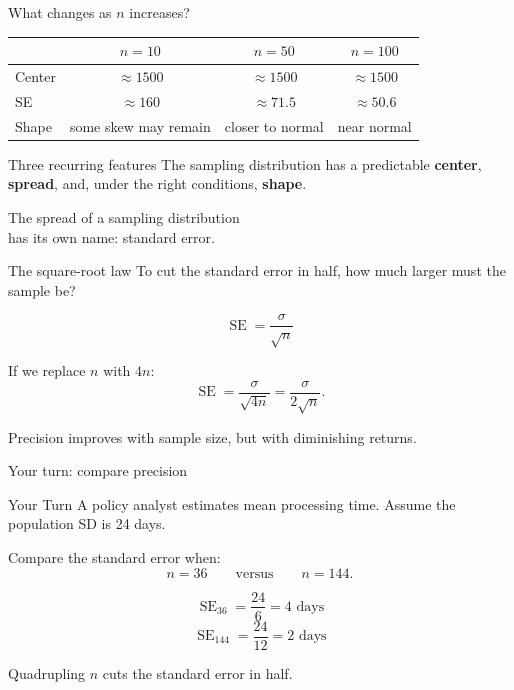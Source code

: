 \documentclass[11pt,aspectratio=169]{beamer}
\newcommand{\yourturn}[1]{%
\begin{center}
\begin{minipage}{0.90\textwidth}
\begin{alertblock}{Your Turn}
#1
\end{alertblock}
\end{minipage}
\end{center}}
\newcommand{\SE}{\operatorname{SE}}
\begin{document}
\begin{frame}{What changes as $n$ increases?}
\begin{center}
\renewcommand{\arraystretch}{1.3}
\begin{tabular}{lccc}
\toprule
 & $n=10$ & $n=50$ & $n=100$ \\
\midrule
Center & $\approx1500$ & $\approx1500$ & $\approx1500$ \\
SE & $\approx160$ & $\approx71.5$ & $\approx50.6$ \\
Shape & some skew may remain & closer to normal & near normal \\
\bottomrule
\end{tabular}
\end{center}

\vspace{0.8em}
\begin{alertblock}{Three recurring features}
The sampling distribution has a predictable \textbf{center}, \textbf{spread}, and, under the right conditions, \textbf{shape}.
\end{alertblock}
\end{frame}

\begin{frame}[standout]
\Large The spread of a sampling distribution\\has its own name: standard error.
\end{frame}

\begin{frame}{The square-root law}
To cut the standard error in half, how much larger must the sample be?

\[
\SE=\frac{\sigma}{\sqrt{n}}
\]

If we replace $n$ with $4n$:
\[
\SE=\frac{\sigma}{\sqrt{4n}}
=\frac{\sigma}{2\sqrt{n}}.
\]

\begin{center}
\Large {}
\end{center}

\vfill
Precision improves with sample size, but with diminishing returns.
\end{frame}

\begin{frame}{Your turn: compare precision}
\yourturn{A policy analyst estimates mean processing time. Assume the population SD is 24 days.

Compare the standard error when:
\[
n=36 \qquad \text{versus} \qquad n=144.
\]}

\vspace{0.7em}
\[
\SE_{36}=\frac{24}{6}=4\text{ days}
\]
\[
\SE_{144}=\frac{24}{12}=2\text{ days}
\]

\alert{Quadrupling $n$ cuts the standard error in half.}
\end{frame}
\end{document}
